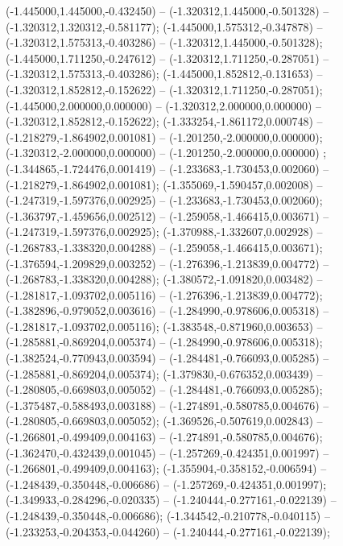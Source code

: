  (-1.445000,1.445000,-0.432450) -- (-1.320312,1.445000,-0.501328) -- (-1.320312,1.320312,-0.581177);
 (-1.445000,1.575312,-0.347878) -- (-1.320312,1.575313,-0.403286) -- (-1.320312,1.445000,-0.501328);
 (-1.445000,1.711250,-0.247612) -- (-1.320312,1.711250,-0.287051) -- (-1.320312,1.575313,-0.403286);
 (-1.445000,1.852812,-0.131653) -- (-1.320312,1.852812,-0.152622) -- (-1.320312,1.711250,-0.287051);
 (-1.445000,2.000000,0.000000) -- (-1.320312,2.000000,0.000000) -- (-1.320312,1.852812,-0.152622);
 (-1.333254,-1.861172,0.000748) -- (-1.218279,-1.864902,0.001081) -- (-1.201250,-2.000000,0.000000);
 (-1.320312,-2.000000,0.000000) -- (-1.201250,-2.000000,0.000000) ;
 (-1.344865,-1.724476,0.001419) -- (-1.233683,-1.730453,0.002060) -- (-1.218279,-1.864902,0.001081);
 (-1.355069,-1.590457,0.002008) -- (-1.247319,-1.597376,0.002925) -- (-1.233683,-1.730453,0.002060);
 (-1.363797,-1.459656,0.002512) -- (-1.259058,-1.466415,0.003671) -- (-1.247319,-1.597376,0.002925);
 (-1.370988,-1.332607,0.002928) -- (-1.268783,-1.338320,0.004288) -- (-1.259058,-1.466415,0.003671);
 (-1.376594,-1.209829,0.003252) -- (-1.276396,-1.213839,0.004772) -- (-1.268783,-1.338320,0.004288);
 (-1.380572,-1.091820,0.003482) -- (-1.281817,-1.093702,0.005116) -- (-1.276396,-1.213839,0.004772);
 (-1.382896,-0.979052,0.003616) -- (-1.284990,-0.978606,0.005318) -- (-1.281817,-1.093702,0.005116);
 (-1.383548,-0.871960,0.003653) -- (-1.285881,-0.869204,0.005374) -- (-1.284990,-0.978606,0.005318);
 (-1.382524,-0.770943,0.003594) -- (-1.284481,-0.766093,0.005285) -- (-1.285881,-0.869204,0.005374);
 (-1.379830,-0.676352,0.003439) -- (-1.280805,-0.669803,0.005052) -- (-1.284481,-0.766093,0.005285);
 (-1.375487,-0.588493,0.003188) -- (-1.274891,-0.580785,0.004676) -- (-1.280805,-0.669803,0.005052);
 (-1.369526,-0.507619,0.002843) -- (-1.266801,-0.499409,0.004163) -- (-1.274891,-0.580785,0.004676);
 (-1.362470,-0.432439,0.001045) -- (-1.257269,-0.424351,0.001997) -- (-1.266801,-0.499409,0.004163);
 (-1.355904,-0.358152,-0.006594) -- (-1.248439,-0.350448,-0.006686) -- (-1.257269,-0.424351,0.001997);
 (-1.349933,-0.284296,-0.020335) -- (-1.240444,-0.277161,-0.022139) -- (-1.248439,-0.350448,-0.006686);
 (-1.344542,-0.210778,-0.040115) -- (-1.233253,-0.204353,-0.044260) -- (-1.240444,-0.277161,-0.022139);
